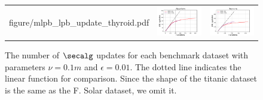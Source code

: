 \begin{figure}[p]
\begin{tabular}{ccc}
\begin{minipage}[t]{0.31\hsize}
            {figure/mlpb_lpb_update_thyroid.pdf}
        \end{minipage}
        &
        \begin{minipage}[t]{0.31\hsize}
            \centering
            \includegraphics[keepaspectratio, scale=0.30]
            {figure/mlpb_lpb_update_waveform.pdf}
        \end{minipage}
        &
        \begin{minipage}[t]{0.31\hsize}
            \centering
            \includegraphics[keepaspectratio, scale=0.30]
            {figure/mlpb_lpb_update_twonorm.pdf}
        \end{minipage}
    \end{tabular}
    \caption{%
        The number of $\secalg$ updates %
        for each benchmark dataset %
        with parameters $\nu = 0.1m$ and $\epsilon = 0.01$. %
        The dotted line indicates the linear function for comparison. %
        Since the shape of the titanic dataset is %
        the same as the F. Solar dataset, %
        we omit it. %
    }
    \label{fig:appendix_lpbcall}
\end{figure}


